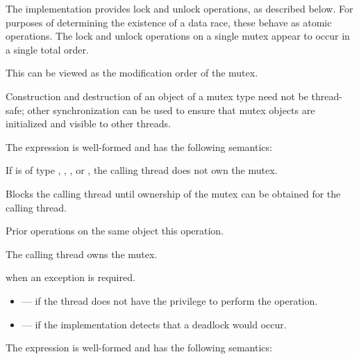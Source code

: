\pnum
The implementation provides lock and unlock operations, as described below.
For purposes of determining the existence of a data race, these behave as
atomic operations. The lock and unlock operations on
a single mutex appear to occur in a single total order.
\begin{note}
This
can be viewed as the modification order of the
mutex.
\end{note}
\begin{note}
Construction and
destruction of an object of a mutex type need not be thread-safe; other
synchronization can be used to ensure that mutex objects are initialized
and visible to other threads.
\end{note}

\pnum
The expression  is well-formed and has the following semantics:

\begin{itemdescr}
\pnum
\expects
If  is of type , ,
, or , the calling
thread does not own the mutex.

\pnum
{}%
\effects
Blocks the calling thread until ownership of the mutex can be obtained for the calling thread.

\pnum
\sync
Prior  operations on the same object
 this operation.

\pnum
\ensures
The calling thread owns the mutex.

\pnum
\result
{}

\pnum
\throws
{} when
an exception is required.

\pnum
\errors
\begin{itemize}
\item {} --- if the thread does not have the
privilege to perform the operation.

\item {} --- if the implementation detects
that a deadlock would occur.
\end{itemize}
\end{itemdescr}

\pnum
The expression  is well-formed and has the following semantics:

